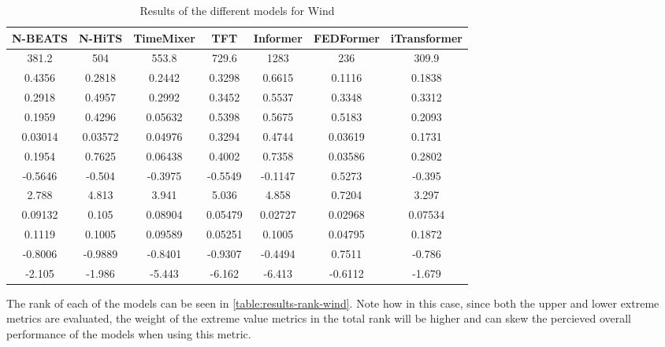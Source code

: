 \begin{table}[ht]
    \footnotesize
    \begin{flushright}
    \begin{tabular}[r]{|ccc|cccc}
        \toprule
        N-BEATS&N-HiTS&TimeMixer&TFT&Informer&FEDFormer&iTransformer  \\
        \midrule            
        381.2&504&553.8&729.6&1283&236&309.9 \\
        0.4356&0.2818&0.2442&0.3298&0.6615&0.1116&0.1838 \\
        0.2918&0.4957&0.2992&0.3452&0.5537&0.3348&0.3312 \\
        \midrule
        0.1959&0.4296&0.05632&0.5398&0.5675&0.5183&0.2093 \\
        0.03014&0.03572&0.04976&0.3294&0.4744&0.03619&0.1731 \\
        0.1954&0.7625&0.06438&0.4002&0.7358&0.03586&0.2802 \\
        \midrule
        -0.5646&-0.504&-0.3975&-0.5549&-0.1147&0.5273&-0.395 \\
        2.788&4.813&3.941&5.036&4.858&0.7204&3.297 \\
        0.09132&0.105&0.08904&0.05479&0.02727&0.02968&0.07534 \\
        0.1119&0.1005&0.09589&0.05251&0.1005&0.04795&0.1872 \\
        -0.8006&-0.9889&-0.8401&-0.9307&-0.4494&0.7511&-0.786 \\
        -2.105&-1.986&-5.443&-6.162&-6.413&-0.6112&-1.679 \\
        \bottomrule
    \end{tabular}
    \end{flushright}
    \caption{Results of the different models for Wind\label{long}}
    \label{table:results-wind}
\end{table}

The rank of each of the models can be seen in \autoref{table:results-rank-wind}. Note how in this case, since both the upper and lower extreme metrics are evaluated, the weight of the extreme value metrics in the total rank will be higher and can skew the percieved overall performance of the models when using this metric.

